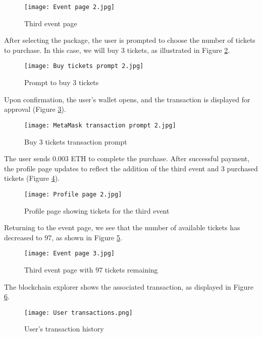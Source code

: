 \begin{figure}[H]
    \texttt{[image: Event page 2.jpg]}
    \centering
    \caption{Third event page}
    \label{fig:buy_tickets_event}
\end{figure}

After selecting the package, the user is prompted to choose the number of
tickets to purchase. In this case, we will buy 3 tickets, as illustrated in
Figure \ref{fig:buy_tickets_prompt_2}.

\begin{figure}[H]
    \texttt{[image: Buy tickets prompt 2.jpg]}
    \centering
    \caption{Prompt to buy 3 tickets}
    \label{fig:buy_tickets_prompt_2}
\end{figure}

Upon confirmation, the user's wallet opens, and the transaction is displayed
for approval (Figure \ref{fig:buy_tickets_transaction}).

\begin{figure}[H]
    \texttt{[image: MetaMask transaction prompt 2.jpg]}
    \centering
    \caption{Buy 3 tickets transaction prompt}
    \label{fig:buy_tickets_transaction}
\end{figure}

The user sends 0.003 ETH to complete the purchase. After successful payment,
the profile page updates to reflect the addition of the third event and 3
purchased tickets (Figure \ref{fig:profile_page_2}).

\begin{figure}[H]
    \texttt{[image: Profile page 2.jpg]}
    \centering
    \caption{Profile page showing tickets for the third event}
    \label{fig:profile_page_2}
\end{figure}

Returning to the event page, we see that the number of available tickets has
decreased to 97, as shown in Figure \ref{fig:buy_tickets_event_2}.

\begin{figure}[H]
    \texttt{[image: Event page 3.jpg]}
    \centering
    \caption{Third event page with 97 tickets remaining}
    \label{fig:buy_tickets_event_2}
\end{figure}

The blockchain explorer shows the associated transaction, as displayed in
Figure \ref{fig:user_transactions}.

\begin{figure}[H]
    \texttt{[image: User transactions.png]}
    \centering
    \caption{User's transaction history}
    \label{fig:user_transactions}
\end{figure}

